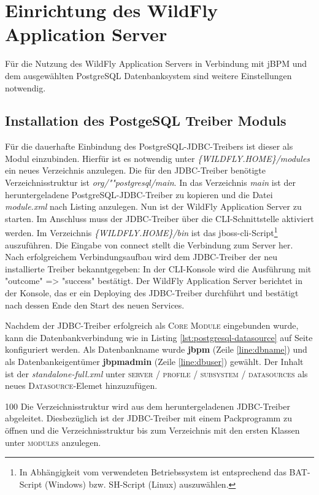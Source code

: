 \section{Einrichtung des WildFly Application Server}
Für die Nutzung des WildFly Application Servers in Verbindung mit jBPM und dem ausgewählten PostgreSQL Datenbanksystem sind weitere Einstellungen notwendig.

\subsection{Installation des PostgeSQL Treiber Moduls}
Für die dauerhafte Einbindung des PostgreSQL-JDBC-Treibers ist dieser als Modul einzubinden. Hierfür ist es notwendig unter \emph{\{WILDFLY.HOME\}/modules} ein neues Verzeichnis anzulegen. Die für den JDBC-Treiber benötigte Verzeichnisstruktur ist \emph{org/""postgresql/main}. In das Verzeichnis \emph{main} ist der heruntergeladene PostgreSQL-JDBC-Treiber zu kopieren und die Datei \emph{module.xml} nach Listing  anzulegen. Nun ist der WildFly Application Server zu starten.
Im Anschluss muss der JDBC-Treiber über die CLI-Schnittstelle aktiviert werden. Im Verzeichnis \emph{\{WILDFLY.HOME\}/bin} ist das jboss-cli-Script\footnote{In Abhängigkeit vom verwendeten Betriebssystem ist entsprechend das BAT-Script (Windows) bzw. SH-Script (Linux) auszuwählen.} auszuführen.
Die Eingabe von {\ttfamily connect} stellt die Verbindung zum Server her. Nach erfolgreichem Verbindungsaufbau wird dem JDBC-Treiber der neu installierte Treiber bekanntgegeben: 
In der CLI-Konsole wird die Ausführung mit {\ttfamily "{}outcome"{} => "{}success"{}} bestätigt. Der WildFly Application Server berichtet in der Konsole, das er ein {\ttfamily Deploying} des JDBC-Treiber durchführt und bestätigt nach dessen Ende den Start des neuen Services.

Nachdem der JDBC-Treiber erfolgreich als \textsc{Core Module} eingebunden wurde, kann die Datenbankverbindung wie in Listing \ref{lst:postgresql-datasource} auf Seite \pageref{lst:postgresql-datasource} konfiguriert werden.
Als Datenbankname wurde \textbf{jbpm} (Zeile \ref{line:dbname}) und als Datenbankeigentümer \textbf{jbpmadmin} (Zeile \ref{line:dbuser}) gewählt. Der Inhalt ist der \emph{standalone-full.xml} unter \textsc{server / profile / subsystem / datasources} als neues \textsc{Datasource}-Elemet hinzuzufügen.
\begin{info}{100}
	Die Verzeichnisstruktur wird aus dem heruntergeladenen JDBC-Treiber abgeleitet. Diesbezüglich ist der JDBC-Treiber mit einem Packprogramm zu öffnen und die Verzeichnisstruktur bis zum Verzeichnis mit den ersten Klassen unter \textsc{modules} anzulegen.
\end{info}